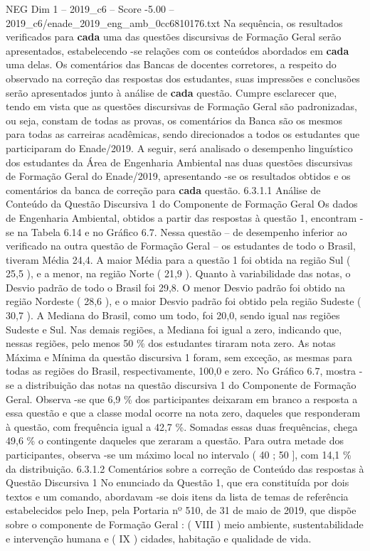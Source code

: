 \begin{textsample}{NEG Dim 1 – 2019\_c6 – Score -5.00 – 2019\_c6/enade\_2019\_eng\_amb\_0cc6810176.txt}
Na sequência, os resultados verificados para \textbf{cada} uma das questões discursivas de Formação Geral serão apresentados, estabelecendo -se relações com os conteúdos abordados em \textbf{cada} uma delas.
Os comentários das Bancas de docentes corretores, a respeito do observado na correção das respostas dos estudantes, suas impressões e conclusões serão apresentados junto à análise de \textbf{cada} questão.
Cumpre esclarecer que, tendo em vista que as questões discursivas de Formação Geral são padronizadas, ou seja, constam de todas as provas, os comentários da Banca são os mesmos para todas as carreiras acadêmicas, sendo direcionados a todos os estudantes que participaram do Enade/2019.
A seguir, será analisado o desempenho linguístico dos estudantes da Área de Engenharia Ambiental nas duas questões discursivas de Formação Geral do Enade/2019, apresentando -se os resultados obtidos e os comentários da banca de correção para \textbf{cada} questão. 6.3.1.1 Análise de Conteúdo da Questão Discursiva 1 do Componente de Formação Geral Os dados de Engenharia Ambiental, obtidos a partir das respostas à questão 1, encontram -se na Tabela 6.14 e no Gráfico 6.7.
Nessa questão – de desempenho inferior ao verificado na outra questão de Formação Geral – os estudantes de todo o Brasil, tiveram Média 24,4.
A maior Média para a questão 1 foi obtida na região Sul ( 25,5 ), e a menor, na região Norte ( 21,9 ).
Quanto à variabilidade das notas, o Desvio padrão de todo o Brasil foi 29,8.
O menor Desvio padrão foi obtido na região Nordeste ( 28,6 ), e o maior Desvio padrão foi obtido pela região Sudeste ( 30,7 ).
A Mediana do Brasil, como um todo, foi 20,0, sendo igual nas regiões Sudeste e Sul.
Nas demais regiões, a Mediana foi igual a zero, indicando que, nessas regiões, pelo menos 50 \% dos estudantes tiraram nota zero.
As notas Máxima e Mínima da questão discursiva 1 foram, sem exceção, as mesmas para todas as regiões do Brasil, respectivamente, 100,0 e zero.
No Gráfico 6.7, mostra -se a distribuição das notas na questão discursiva 1 do Componente de Formação Geral.
Observa -se que 6,9 \% dos participantes deixaram em branco a resposta a essa questão e que a classe modal ocorre na nota zero, daqueles que responderam à questão, com frequência igual a 42,7 \%.
Somadas essas duas frequências, chega 49,6 \% o contingente daqueles que zeraram a questão.
Para outra metade dos participantes, observa -se um máximo local no intervalo ( 40 ; 50 ], com 14,1 \% da distribuição. 6.3.1.2 Comentários sobre a correção de Conteúdo das respostas à Questão Discursiva 1 No enunciado da Questão 1, que era constituída por dois textos e um comando, abordavam -se dois itens da lista de temas de referência estabelecidos pelo Inep, pela Portaria nº 510, de 31 de maio de 2019, que dispõe sobre o componente de Formação Geral : ( VIII ) meio ambiente, sustentabilidade e intervenção humana e ( IX ) cidades, habitação e qualidade de vida.

\end{textsample}
